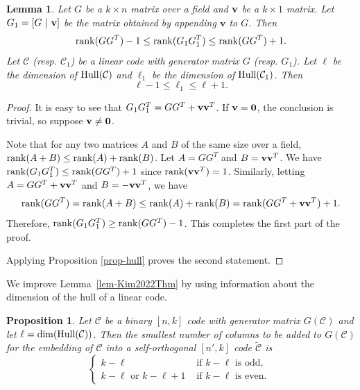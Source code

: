 \documentclass{article}
\newtheorem{lemma}[theorem]{Lemma}
\newtheorem{prop}[theorem]{Proposition}
\theoremstyle{definition}
\theoremstyle{remark}
\newcommand{\rank}{\operatorname{rank}}
\begin{document}
\begin{lemma} \label{lem-dim-hul}
Let $G$ be a $k \times n$ matrix over a field and ${\bf{v}}$ be a $k \times 1$ matrix. Let $G_1 = [G ~|~{\bf{v}}]$ be the matrix obtained by appending $\mathbf{v}$ to $G$. Then
\[
{\rm{rank}}(GG^T) -1 \le {\rm{rank}}(G_1 G_1^T)  \le {\rm{rank}}(GG^T) +1.
\]
Let $\mathcal C$ (resp. $\mathcal C_1$) be a linear code with generator matrix $G$ (resp. $G_1$).
Let $\ell$ be the dimension of $\rm{Hull}(\mathcal C)$ and $\ell_1$ be the dimension of $\rm{Hull}(\mathcal C_1)$. Then
\[
\ell -1 \le \ell_1  \le \ell +1.
\]
\end{lemma}

\begin{proof}
It is easy to see that $G_1 G_1^T = G G^T + {\bf{v}}{\bf{v}}^T$. If ${\bf v} = {\bf 0}$, the conclusion is trivial, so suppose ${\bf v} \neq {\bf 0}$.

Note that for any two matrices $A$ and $B$ of the same size over a field, ${\rm{rank}}(A+B) \le  {\rm{rank}}(A) + {\rm{rank}}(B)$. Let $A=GG^T$ and $B={\bf{v}}{\bf{v}}^T$.  We have ${\rm{rank}}(G_1 G_1^T)  \le {\rm{rank}}(GG^T) +1$ since $\rank({\bf{v}}{\bf{v}}^T) = 1$. Similarly, letting $A=GG^T + {\bf{v}}{\bf{v}}^T$ and $B =-{\bf{v}}{\bf{v}}^T$, we have
\[
{\rm{rank}}(GG^T)= {\rm{rank}}(A+B) \le  {\rm{rank}}(A) + {\rm{rank}}(B) = {\rm{rank}}(GG^T + {\bf{v}}{\bf{v}}^T)  + 1.
\]
Therefore,
${\rm{rank}}(G_1G_1^T) \ge {\rm{rank}}(GG^T) -1$. This completes the first part of the proof.

Applying Proposition \ref{prop-hull} proves the second statement.
\end{proof}

We improve Lemma~\ref{lem-Kim2022Thm} by using information about the dimension of the hull of a linear code.

\begin{prop} \label{thm-hull}
Let $\mathcal C$ be a binary $[n, k]$ code with generator matrix $G(\mathcal C)$ and let $\ell =\dim({\rm{Hull}}(\mathcal C))$. Then the smallest number of columns to be added to $G(\mathcal C)$ for the embedding of $\mathcal C$ into a self-orthogonal $[n', k]$ code $\tilde{\mathcal{C}}$ is
\[
\begin{cases}
 k - \ell & {\mbox{ if }} k - \ell {\mbox{ is odd, }} \\
 k - \ell {\mbox{ or }} k- \ell +1 & {\mbox{ if }} k - \ell {\mbox{ is even. }}
\end{cases}
\]
\end{prop}
\end{document}
